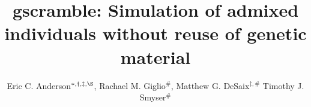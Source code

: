 

\newcommand{\myTitle}{{\sc gscramble:} Simulation of admixed individuals without reuse of genetic material}
\title{\myTitle}

\newcommand{\myAuthors}{Eric C. Anderson$^{*,\dagger,\ddag,\S}$, Rachael M. Giglio$^{\#}$, Matthew G. DeSaix$^{\ddag,\#}$ Timothy J. Smyser$^{\#}$}
\author{Eric C. Anderson$^{*,\dagger,\ddag,\S}$, Rachael M. Giglio$^{\#}$, Matthew G. DeSaix$^{\ddag,\#}$ Timothy J. Smyser$^{\#}$}


\newcommand{\myAffiliations}{$^*$Fisheries Ecology Division,
    Southwest Fisheries Science Center, National Marine Fisheries Service, NOAA,
    110 McAllister Road,
    Santa Cruz, CA 95060, USA.,
    $^\dagger$Dept. of Fish, Wildlife, and Conservation Biology, Colorado State University, Fort Collins, CO, USA,
    $^\ddag$Dept. of Biology, Colorado State University, Fort Collins, CO, USA,
    $^\#$National Wildlife Research Center, United States Department of Agriculture, Wildlife Services,
    Fort Collins, CO, USA
}
\renewcommand{\AuthorAddresses}{\myAffiliations}

\renewcommand{\KeyWords}{genetic stock identification, mixture deconvolution, permutation testing, power analysis, R package}

\renewcommand{\CorrespondingAuthor}{Eric C. Anderson, eric.anderson@noaa.gov}


\newcommand{\myEmailAddress}{eric.anderson@noaa.gov}
\newcommand{\myEmailFootnote}{$^\S$}

\newcommand{\myCopyright}{}

\newcommand{\myRunningTitle}{Linkage-aware power assessment for admixture proportions}
\renewcommand{\RunningTitle}{\myRunningTitle}

\newcommand{\myRunningAuthor}{Anderson {\em et al.}}


